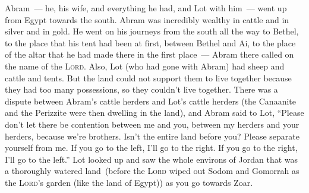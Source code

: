 
\begin{inparaenum}
     Abram~--- he, his wife, and everything he had, and Lot with him~--- went up from Egypt towards the south.%
     Abram was incredibly wealthy in cattle and in silver and in gold.%
     He went on his journeys from the south all the way to Bethel, to the place that his tent had been at first, between Bethel and Ai,%
     to the place of the altar that he had made there in the first place~--- Abram there called on the name of the \textsc{Lord}.%
     Also, Lot (who had gone with Abram) had sheep and cattle and tents.%
     But the land could not support them to live together because they had too many possessions, so they couldn't live together.%
     There was a dispute between Abram's cattle herders and Lot's cattle herders (the Canaanite and the Perizzite were then dwelling in the land),%
     and Abram said to Lot, ``Please don't let there be contention between me and you, between my herders and your herders, because we're brothers.%
     Isn't the entire land before you? Please separate yourself from me. If you go to the left, I'll go to the right. If you go to the right, I'll go to the left.''%
     Lot looked up and saw the whole environs of Jordan that was a thoroughly watered land\understood\ (before the \textsc{Lord} wiped out Sodom and Gomorrah as the \textsc{Lord}'s garden (like the land of Egypt)) as you go towards Zoar.%

\end{inparaenum}

